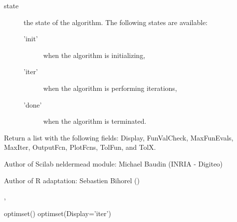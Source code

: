 \begin{Details}
\begin{description}
\item[state] the state of the algorithm. The following states are
available:\begin{description}

\item['init'] when the algorithm is initializing,
\item['iter'] when the algorithm is performing iterations,
\item['done'] when the algorithm is terminated.

\end{description}



\end{description}

\end{Details}
%
\begin{Value}
Return a list with the following fields: Display, FunValCheck, MaxFunEvals,
MaxIter, OutputFcn, PlotFcns, TolFun, and TolX.
\end{Value}
%
\begin{Author}\relax
Author of Scilab neldermead module: Michael Baudin (INRIA - Digiteo)

Author of R adaptation: Sebastien Bihorel ()
\end{Author}
%
\begin{SeeAlso}\relax
{},
\end{SeeAlso}
%
\begin{Examples}
\begin{ExampleCode}
  optimset()
  optimset(Display='iter')
\end{ExampleCode}
\end{Examples}
